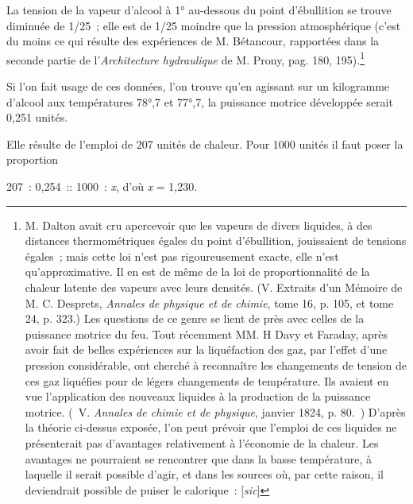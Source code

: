 \documentclass[french,twoside]{book} %
\begin{document}
La tension de la vapeur d’alcool à 1° au-dessous du point d’ébullition se trouve diminuée de 1/25 ; elle est de 1/25 moindre que la pression atmosphérique (c’est du moins ce qui résulte des expériences de M. Bétancour, rapportées dans la seconde partie de l’\emph{Architecture hydraulique} de M. Prony, pag. 180, 195).\footnote{M. Dalton avait cru apercevoir que les vapeurs de divers liquides, à des distances thermométriques égales du point d’ébullition, jouissaient de tensions égales ; mais cette loi n’est pas rigoureusement exacte, elle n’est qu’approximative. Il en est de même de la loi de proportionnalité de la chaleur latente des vapeurs avec leurs densités. (V. Extraits d’un Mémoire de M. C. Desprets, \emph{Annales de physique et de chimie}, tome 16, p. 105, et tome 24, p. 323.) Les questions de ce genre se lient de près avec celles de la puissance motrice du feu. Tout récemment MM. H Davy et Faraday, après avoir fait de belles expériences sur la liquéfaction des gaz, par l’effet d’une pression considérable, ont cherché à reconnaître les changements de tension de ces gaz liquéfies pour de légers changements de température. Ils avaient en vue l’application des nouveaux liquides à la production de la puissance motrice. ( V. \emph{Annales de chimie et de physique}, janvier 1824, p. 80. ) D’après la théorie ci-dessus exposée, l’on peut prévoir que l’emploi de ces liquides ne présenterait pas d’avantages relativement à l’économie de la chaleur. Les avantages ne pourraient se rencontrer que dans la basse température, à laquelle il serait possible d’agir, et dans les sources où, par cette raison, il deviendrait possible de puiser le calorique : [\emph{sic}]}\par
Si l’on fait usage de ces données, l’on trouve qu’en agissant sur un kilogramme d’alcool aux températures 78°,7 et 77°,7, la puissance motrice développée serait 0,251 unités.\par
Elle résulte de l’emploi de 207 unités de chaleur. Pour 1000 unités il faut poser la proportion\par

\begin{center}
207 : 0,254 :: 1000 : \emph{x}, d’où \emph{x} = 1,230.\par
\end{center}
\end{document}

